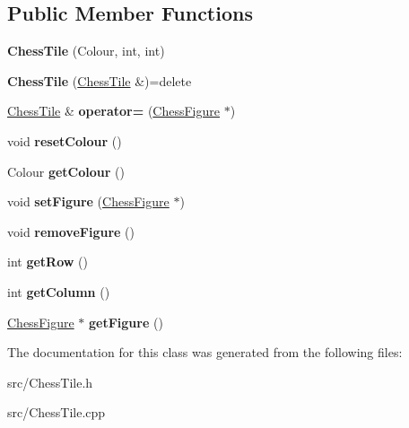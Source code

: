 \subsection*{Public Member Functions}
\begin{DoxyCompactItemize}
\item 
\mbox{\label{classChessTile_af1772f916ec50dcbe8b9f14618cf0687}} 
{\bfseries Chess\+Tile} (Colour, int, int)
\item 
\mbox{\label{classChessTile_a20bec4843dae5df211f99bc26b18c9b5}} 
{\bfseries Chess\+Tile} (\mbox{\hyperlink{classChessTile}{Chess\+Tile}} \&)=delete
\item 
\mbox{\label{classChessTile_ae9dc270be7b2b2b7427eb7bc5e9b2842}} 
\mbox{\hyperlink{classChessTile}{Chess\+Tile}} \& {\bfseries operator=} (\mbox{\hyperlink{classChessFigure}{Chess\+Figure}} $\ast$)
\item 
\mbox{\label{classChessTile_a310a1691be6e8e58f452ec817ab3db2f}} 
void {\bfseries reset\+Colour} ()
\item 
\mbox{\label{classChessTile_af88f05cd0b3ea319cd11a78aec92499f}} 
Colour {\bfseries get\+Colour} ()
\item 
\mbox{\label{classChessTile_a31724ea2e6019fb367b8b2e8812d8fa6}} 
void {\bfseries set\+Figure} (\mbox{\hyperlink{classChessFigure}{Chess\+Figure}} $\ast$)
\item 
\mbox{\label{classChessTile_a3e6e2cb3d4582c05b48804105beeafb6}} 
void {\bfseries remove\+Figure} ()
\item 
\mbox{\label{classChessTile_ab4ee290a35adcbc65b0dfd15c6bb4672}} 
int {\bfseries get\+Row} ()
\item 
\mbox{\label{classChessTile_a390e44644921273113a9b74a0698ed7a}} 
int {\bfseries get\+Column} ()
\item 
\mbox{\label{classChessTile_a7aecc8930e76dc4ea934abe16dc68dcb}} 
\mbox{\hyperlink{classChessFigure}{Chess\+Figure}} $\ast$ {\bfseries get\+Figure} ()
\end{DoxyCompactItemize}


The documentation for this class was generated from the following files\+:\begin{DoxyCompactItemize}
\item 
src/Chess\+Tile.\+h\item 
src/Chess\+Tile.\+cpp\end{DoxyCompactItemize}
